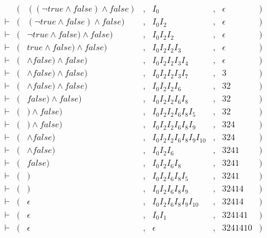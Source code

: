 \begin{equation*}
\begin{aligned}
	   &(& ((\neg true \land false) \land false) &,& I_0 &,& \epsilon &) \\
\vdash &(& (\neg true \land false) \land false) &,& I_0I_2 &,& \epsilon &) \\
\vdash &(& \neg true \land false) \land false) &,& I_0I_2I_2 &,& \epsilon &) \\
\vdash &(& true \land false) \land false) &,& I_0I_2I_2I_3 &,& \epsilon &) \\
\vdash &(& \land false) \land false) &,& I_0I_2I_2I_3I_4 &,& \epsilon &) \\
\vdash &(& \land false) \land false) &,& I_0I_2I_2I_3I_7 &,& 3 &) \\
\vdash &(& \land false) \land false) &,& I_0I_2I_2I_6 &,& 32 &) \\
\vdash &(& false) \land false) &,& I_0I_2I_2I_6I_8 &,& 32 &) \\
\vdash &(& ) \land false) &,& I_0I_2I_2I_6I_8I_5 &,& 32 &) \\
\vdash &(& ) \land false) &,& I_0I_2I_2I_6I_8I_9 &,& 324 &) \\
\vdash &(& \land false) &,& I_0I_2I_2I_6I_8I_9I_{10} &,& 324 &) \\
\vdash &(& \land false) &,& I_0I_2I_6 &,& 3241 &) \\
\vdash &(& false) &,& I_0I_2I_6I_8 &,& 3241 &) \\
\vdash &(& ) &,& I_0I_2I_6I_8I_5 &,& 3241 &) \\
\vdash &(& ) &,& I_0I_2I_6I_8I_9 &,& 32414 &) \\
\vdash &(& \epsilon &,& I_0I_2I_6I_8I_9I_{10} &,& 32414 &) \\
\vdash &(& \epsilon &,& I_0I_1 &,& 324141 &) \\
\vdash &(& \epsilon &,& \epsilon &,& 3241410 &)
\end{aligned}
\end{equation*}
